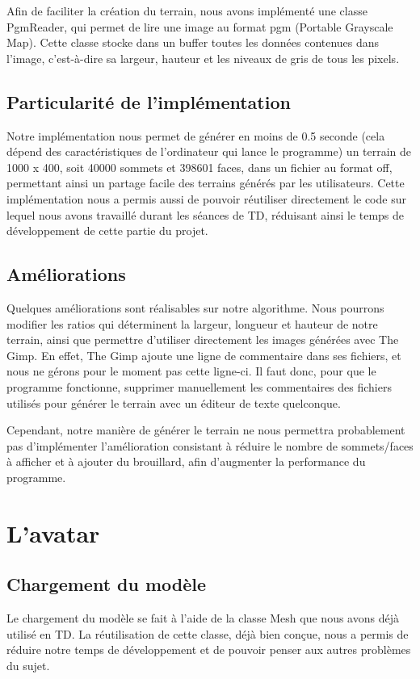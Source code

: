 \documentclass{report}
\begin{document}
Afin de faciliter la création du terrain, nous avons implémenté une classe PgmReader, qui permet de lire une image au format pgm (Portable Grayscale Map). Cette classe stocke dans un buffer toutes les données contenues dans l’image, c’est-à-dire sa largeur, hauteur et les niveaux de gris de tous les pixels.

\subsection*{Particularité de l'implémentation}
Notre implémentation nous permet de générer en moins de 0.5 seconde (cela dépend des caractéristiques de l’ordinateur qui lance le programme) un terrain de 1000 x 400, soit 40000 sommets et 398601 faces, dans un fichier au format off, permettant ainsi un partage facile des terrains générés par les utilisateurs. Cette implémentation nous a permis aussi de pouvoir réutiliser directement le code sur lequel nous avons travaillé durant les séances de TD, réduisant ainsi le temps de développement de cette partie du projet.

\subsection*{Améliorations}
Quelques améliorations sont réalisables sur notre algorithme. Nous pourrons modifier les ratios qui déterminent la largeur, longueur et hauteur de notre terrain, ainsi que permettre d’utiliser directement les images générées avec The Gimp. En effet, The Gimp ajoute une ligne de commentaire dans ses fichiers, et nous ne gérons pour le moment pas cette ligne-ci. Il faut donc, pour que le programme fonctionne, supprimer manuellement les commentaires des fichiers utilisés pour générer le terrain avec un éditeur de texte quelconque.

Cependant, notre manière de générer le terrain ne nous permettra probablement pas d’implémenter l’amélioration consistant à réduire le nombre de sommets/faces à afficher et à ajouter du brouillard, afin d’augmenter la performance du programme.

\section{L'avatar}

\subsection*{Chargement du modèle}
Le chargement du modèle se fait à l'aide de la classe Mesh que nous avons déjà utilisé en TD. La réutilisation de cette classe, déjà bien conçue, nous a permis de réduire notre temps de développement et de pouvoir penser aux autres problèmes du sujet.
\end{document}
